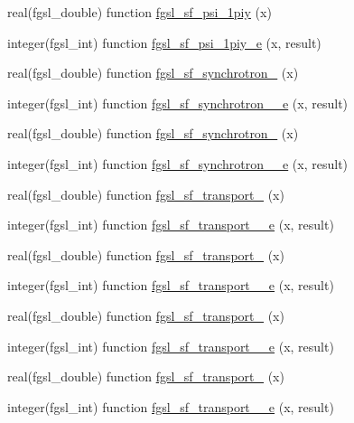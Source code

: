 \begin{DoxyCompactItemize}
real(fgsl\+\_\+double) function \hyperlink{specfunc_8finc_a55d5470345e74e337247c83d906ce14e}{fgsl\+\_\+sf\+\_\+psi\+\_\+1piy} (x)
\item 
integer(fgsl\+\_\+int) function \hyperlink{specfunc_8finc_a16d5deef40eaf1313ebe52a074b60b73}{fgsl\+\_\+sf\+\_\+psi\+\_\+1piy\+\_\+e} (x, result)
\item 
real(fgsl\+\_\+double) function \hyperlink{specfunc_8finc_a34fa10e4dcc187cb900f253714e6c29c}{fgsl\+\_\+sf\+\_\+synchrotron\+\_} (x)
\item 
integer(fgsl\+\_\+int) function \hyperlink{specfunc_8finc_adc7ff5b8886e060fb8dbb58f517dc7fa}{fgsl\+\_\+sf\+\_\+synchrotron\+\_\+\_\+e} (x, result)
\item 
real(fgsl\+\_\+double) function \hyperlink{specfunc_8finc_afbf1c93cb6fb629046d5228ab93cba8d}{fgsl\+\_\+sf\+\_\+synchrotron\+\_} (x)
\item 
integer(fgsl\+\_\+int) function \hyperlink{specfunc_8finc_a66807d05fcd1f327597dc10126dac061}{fgsl\+\_\+sf\+\_\+synchrotron\+\_\+\_\+e} (x, result)
\item 
real(fgsl\+\_\+double) function \hyperlink{specfunc_8finc_a08185c256797e453e453f095259a6f1d}{fgsl\+\_\+sf\+\_\+transport\+\_} (x)
\item 
integer(fgsl\+\_\+int) function \hyperlink{specfunc_8finc_aa0d7b42b274ec2614c0d055f95fa815c}{fgsl\+\_\+sf\+\_\+transport\+\_\+\_\+e} (x, result)
\item 
real(fgsl\+\_\+double) function \hyperlink{specfunc_8finc_a666e431990a5c84ba04a9986e8cc83e7}{fgsl\+\_\+sf\+\_\+transport\+\_} (x)
\item 
integer(fgsl\+\_\+int) function \hyperlink{specfunc_8finc_acbe93f73e5f115885c4ea244d1e2e02e}{fgsl\+\_\+sf\+\_\+transport\+\_\+\_\+e} (x, result)
\item 
real(fgsl\+\_\+double) function \hyperlink{specfunc_8finc_a938e89b7c0e98f4bd33f5121ce7b3d85}{fgsl\+\_\+sf\+\_\+transport\+\_} (x)
\item 
integer(fgsl\+\_\+int) function \hyperlink{specfunc_8finc_aab758066583d4c24bce57899092b6897}{fgsl\+\_\+sf\+\_\+transport\+\_\+\_\+e} (x, result)
\item 
real(fgsl\+\_\+double) function \hyperlink{specfunc_8finc_a8e68293fb93439d28464bb8c412301c5}{fgsl\+\_\+sf\+\_\+transport\+\_} (x)
\item 
integer(fgsl\+\_\+int) function \hyperlink{specfunc_8finc_ae2471dfc998320a633b03dd217ee4a4a}{fgsl\+\_\+sf\+\_\+transport\+\_\+\_\+e} (x, result)
\item 

\end{DoxyCompactItemize}
